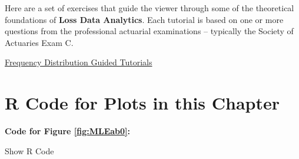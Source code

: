 \documentclass[]{book}
\theoremstyle{definition}
\theoremstyle{definition}
\theoremstyle{definition}
\theoremstyle{remark}
\begin{document}
Here are a set of exercises that guide the viewer through some of the
theoretical foundations of \textbf{Loss Data Analytics}. Each tutorial
is based on one or more questions from the professional actuarial
examinations -- typically the Society of Actuaries Exam C.

\href{https://www.ssc.wisc.edu/~jfrees/loss-data-analytics/loss-data-analytics-problems/}{Frequency
Distribution Guided Tutorials}

\section{R Code for Plots in this
Chapter}\label{r-code-for-plots-in-this-chapter}

\textbf{Code for Figure \ref{fig:MLEab0}:}

Show R Code
\end{document}

